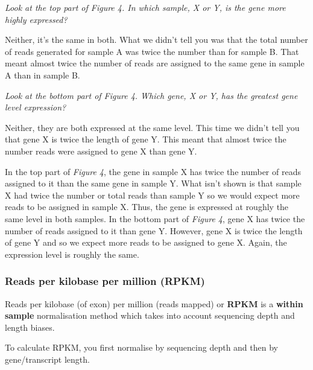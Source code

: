 \documentclass[11pt]{article}
\begin{document}
    \textit{Look at the top part of Figure 4. In which sample, X or Y, is the
gene more highly expressed?}

Neither, it's the same in both. What we didn't tell you was that the
total number of reads generated for sample A was twice the number than
for sample B. That meant almost twice the number of reads are assigned
to the same gene in sample A than in sample B.

\textit{Look at the bottom part of Figure 4. Which gene, X or Y, has the
greatest gene level expression?}

Neither, they are both expressed at the same level. This time we didn't
tell you that gene X is twice the length of gene Y. This meant that
almost twice the number reads were assigned to gene X than gene Y.

In the top part of \textit{Figure 4}, the gene in sample X has twice the
number of reads assigned to it than the same gene in sample Y. What
isn't shown is that sample X had twice the number or total reads than
sample Y so we would expect more reads to be assigned in sample X. Thus,
the gene is expressed at roughly the same level in both samples. In the
bottom part of \textit{Figure 4}, gene X has twice the number of reads
assigned to it than gene Y. However, gene X is twice the length of gene
Y and so we expect more reads to be assigned to gene X. Again, the
expression level is roughly the same.

    \hypertarget{reads-per-kilobase-per-million-rpkm}{%
\subsubsection{Reads per kilobase per million
(RPKM)}\label{reads-per-kilobase-per-million-rpkm}}

Reads per kilobase (of exon) per million (reads mapped) or \textbf{RPKM}
is a \textbf{within sample} normalisation method which takes into
account sequencing depth and length biases.

To calculate RPKM, you first normalise by sequencing depth and then by
gene/transcript length.
\end{document}
